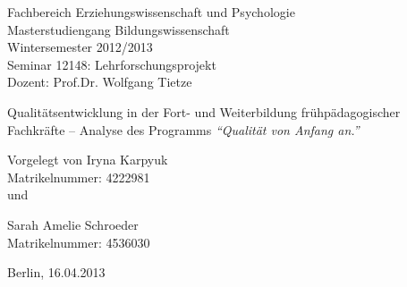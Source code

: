 \documentclass[12pt,a4paper]{article}
\author{}
\title{  }
\begin{document}
\begin{titlepage}

\normalsize

\begin{flushleft}
Fachbereich Erziehungswissenschaft und Psychologie \\
Masterstudiengang Bildungswissenschaft \\
Wintersemester 2012/2013 \\
Seminar 12148: Lehrforschungsprojekt\\ 
Dozent: Prof.Dr. Wolfgang Tietze\\

\end{flushleft}

\vspace{60pt}

\begin{center}
\huge
Qualitätsentwicklung in der Fort- und Weiterbildung frühpädagogischer Fachkräfte – Analyse des
Programms\textit{ "`Qualität von Anfang an."'}\\  
\vspace{50pt}
 \end{center}
                         
\normalsize  
\begin{center}                             
Vorgelegt von Iryna Karpyuk \\
Matrikelnummer: 4222981\\

 und
 
Sarah Amelie Schroeder\\
Matrikelnummer: 4536030\\
\end{center}                  
           
\begin{flushleft}
\normalsize
\vspace{150pt}


Berlin, 16.04.2013
\end{flushleft}
\end{titlepage}
\normalsize                                              
\pagebreak
\end{document}
